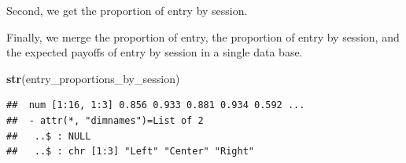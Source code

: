 \documentclass[]{article}
\newenvironment{Shaded}{\begin{snugshade}}{\end{snugshade}}
\newcommand{\KeywordTok}[1]{\textcolor[rgb]{0.13,0.29,0.53}{\textbf{#1}}}
\newcommand{\DataTypeTok}[1]{\textcolor[rgb]{0.13,0.29,0.53}{#1}}
\newcommand{\DecValTok}[1]{\textcolor[rgb]{0.00,0.00,0.81}{#1}}
\newcommand{\StringTok}[1]{\textcolor[rgb]{0.31,0.60,0.02}{#1}}
\newcommand{\OtherTok}[1]{\textcolor[rgb]{0.56,0.35,0.01}{#1}}
\newcommand{\OperatorTok}[1]{\textcolor[rgb]{0.81,0.36,0.00}{\textbf{#1}}}
\newcommand{\NormalTok}[1]{#1}
\begin{document}
\begin{Shaded}
\end{Shaded}

Second, we get the proportion of entry by session.

Finally, we merge the proportion of entry, the proportion of entry by
session, and the expected payoffs of entry by session in a single data
base.

\begin{Shaded}
\begin{Highlighting}[]
\KeywordTok{str}\NormalTok{(entry_proportions_by_session)}
\end{Highlighting}
\end{Shaded}

\begin{verbatim}
##  num [1:16, 1:3] 0.856 0.933 0.881 0.934 0.592 ...
##  - attr(*, "dimnames")=List of 2
##   ..$ : NULL
##   ..$ : chr [1:3] "Left" "Center" "Right"
\end{verbatim}
\end{document}
